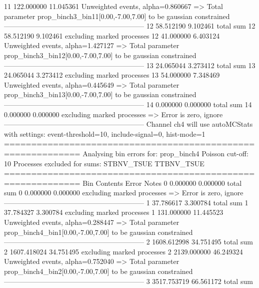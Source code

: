 11         122.000000      11.045361       Unweighted events, alpha=0.860667
  => Total parameter prop_binch3_bin11[0.00,-7.00,7.00] to be gaussian constrained
------------------------------------------------------------
12         58.512190       9.102461        total sum                     
12         58.512190       9.102461        excluding marked processes    
12         41.000000       6.403124        Unweighted events, alpha=1.427127
  => Total parameter prop_binch3_bin12[0.00,-7.00,7.00] to be gaussian constrained
------------------------------------------------------------
13         24.065044       3.273412        total sum                     
13         24.065044       3.273412        excluding marked processes    
13         54.000000       7.348469        Unweighted events, alpha=0.445649
  => Total parameter prop_binch3_bin13[0.00,-7.00,7.00] to be gaussian constrained
------------------------------------------------------------
14         0.000000        0.000000        total sum                     
14         0.000000        0.000000        excluding marked processes    
  => Error is zero, ignore      
------------------------------------------------------------
Channel ch4 will use autoMCStats with settings: event-threshold=10, include-signal=0, hist-mode=1
============================================================
Analysing bin errors for: prop_binch4
Poisson cut-off: 10
Processes excluded for sums: STBNV_TSUE TTBNV_TSUE
============================================================
Bin        Contents        Error           Notes                         
0          0.000000        0.000000        total sum                     
0          0.000000        0.000000        excluding marked processes    
  => Error is zero, ignore      
------------------------------------------------------------
1          37.786617       3.300784        total sum                     
1          37.784327       3.300784        excluding marked processes    
1          131.000000      11.445523       Unweighted events, alpha=0.288447
  => Total parameter prop_binch4_bin1[0.00,-7.00,7.00] to be gaussian constrained
------------------------------------------------------------
2          1608.612998     34.751495       total sum                     
2          1607.418024     34.751495       excluding marked processes    
2          2139.000000     46.249324       Unweighted events, alpha=0.752040
  => Total parameter prop_binch4_bin2[0.00,-7.00,7.00] to be gaussian constrained
------------------------------------------------------------
3          3517.753719     66.561172       total sum                     
